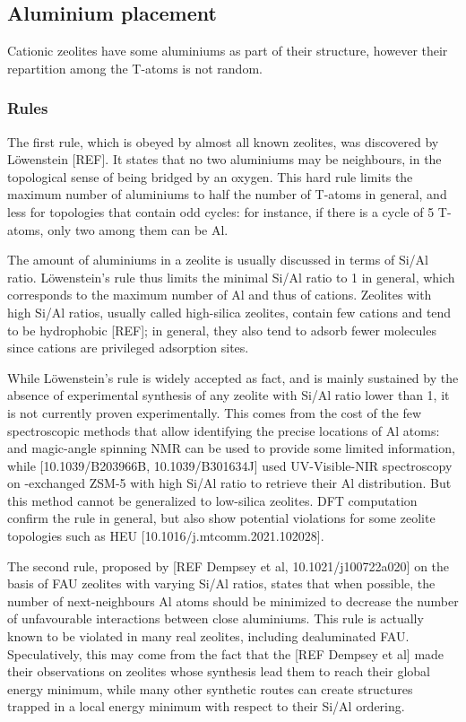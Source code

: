 \documentclass[main.tex]{subfiles}
\begin{document}
\subsection{Aluminium placement}

Cationic zeolites have some aluminiums as part of their structure, however their repartition among the T-atoms is not random.

\subsubsection{Rules}

The first rule, which is obeyed by almost all known zeolites, was discovered by L\"owenstein [REF]. It states that no two aluminiums may be neighbours, in the topological sense of being bridged by an oxygen. This hard rule limits the maximum number of aluminiums to half the number of T-atoms in general, and less for topologies that contain odd cycles: for instance, if there is a cycle of 5 T-atoms, only two among them can be Al.

The amount of aluminiums in a zeolite is usually discussed in terms of Si/Al ratio. L\"owenstein's rule thus limits the minimal Si/Al ratio to 1 in general, which corresponds to the maximum number of Al and thus of cations. Zeolites with high Si/Al ratios, usually called high-silica zeolites, contain few cations and tend to be hydrophobic [REF]; in general, they also tend to adsorb fewer molecules since cations are privileged adsorption sites.

While L\"owenstein's rule is widely accepted as fact, and is mainly sustained by the absence of experimental synthesis of any zeolite with Si/Al ratio lower than 1, it is not currently proven experimentally. This comes from the cost of the few spectroscopic methods that allow identifying the precise locations of Al atoms:  and  magic-angle spinning NMR can be used to provide some limited information, while [10.1039/B203966B, 10.1039/B301634J] used UV-Visible-NIR spectroscopy on -exchanged ZSM-5 with high Si/Al ratio to retrieve their Al distribution. But this method cannot be generalized to low-silica zeolites. DFT computation confirm the rule in general, but also show potential violations for some zeolite topologies such as HEU [10.1016/j.mtcomm.2021.102028].

The second rule, proposed by [REF Dempsey et al, 10.1021/j100722a020] on the basis of FAU zeolites with varying Si/Al ratios, states that when possible, the number of next-neighbours Al atoms should be minimized to decrease the number of unfavourable interactions between close aluminiums. This rule is actually known to be violated in many real zeolites, including dealuminated FAU. Speculatively, this may come from the fact that the [REF Dempsey et al] made their observations on zeolites whose synthesis lead them to reach their global energy minimum, while many other synthetic routes can create structures trapped in a local energy minimum with respect to their Si/Al ordering.
\end{document}
